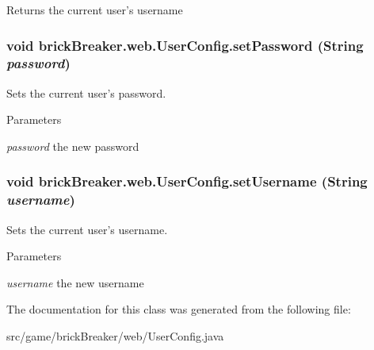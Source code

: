 \begin{DoxyReturn}{Returns}
the current user's username 
\end{DoxyReturn}
\hypertarget{classbrick_breaker_1_1web_1_1_user_config_a4b7cbc1a5c2e83db4e21ecc870b272c7}{
\subsubsection[{setPassword}]{\setlength{\rightskip}{0pt plus 5cm}void brickBreaker.web.UserConfig.setPassword (String {\em password})}}
\label{classbrick_breaker_1_1web_1_1_user_config_a4b7cbc1a5c2e83db4e21ecc870b272c7}
Sets the current user's password.


\begin{DoxyParams}{Parameters}
\item[{\em password}]the new password \end{DoxyParams}
\hypertarget{classbrick_breaker_1_1web_1_1_user_config_a4565256db7d0f30cb7f4b63bd06a7472}{
\subsubsection[{setUsername}]{\setlength{\rightskip}{0pt plus 5cm}void brickBreaker.web.UserConfig.setUsername (String {\em username})}}
\label{classbrick_breaker_1_1web_1_1_user_config_a4565256db7d0f30cb7f4b63bd06a7472}
Sets the current user's username.


\begin{DoxyParams}{Parameters}
\item[{\em username}]the new username \end{DoxyParams}


The documentation for this class was generated from the following file:\begin{DoxyCompactItemize}
\item 
src/game/brickBreaker/web/UserConfig.java\end{DoxyCompactItemize}
